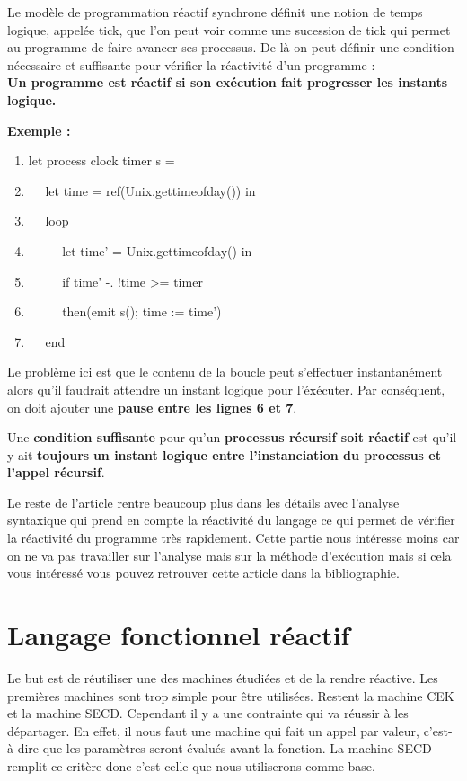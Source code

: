 \documentclass[10pt,a4paper]{report}
\begin{document}
Le modèle de programmation réactif synchrone définit une notion de temps logique, appelée tick, que l'on peut voir comme une sucession de tick qui permet au programme de faire avancer ses processus. De là on peut définir une condition nécessaire et suffisante pour vérifier la réactivité d'un programme : 	
\\\textbf{Un programme est r\'{e}actif si son ex\'{e}cution fait progresser les instants logique.}
\medbreak

\textbf{Exemple :}
\smallbreak
\begin{enumerate}
\item let process clock timer s =
\item $\quad$ let time = ref(Unix.gettimeofday()) in
\item $\quad$ loop
\item $\quad$ $\quad$ let time' = Unix.gettimeofday() in
\item $\quad$ $\quad$ if time' -. !time >= timer
\item $\quad$ $\quad$ then(emit s(); time := time')
\item $\quad$ end 
\end{enumerate}
\medbreak

Le probl\`{e}me ici est que le contenu de la boucle peut s'effectuer instantan\'{e}ment alors qu'il faudrait attendre un instant logique pour l'éxécuter. Par conséquent, on doit ajouter une \textbf{pause entre les lignes 6 et 7}.
\bigbreak

Une \textbf{condition suffisante} pour qu'un \textbf{processus r\'{e}cursif soit r\'{e}actif} est qu'il y ait \textbf{toujours} \textbf{un instant logique entre l'instanciation du processus et l'appel r\'{e}cursif}.
\bigbreak


Le reste de l'article rentre beaucoup plus dans les détails avec l'analyse syntaxique qui prend en compte la réactivité du langage ce qui permet de vérifier la réactivité du programme très rapidement. Cette partie nous intéresse moins car on ne va pas travailler sur l'analyse mais sur la méthode d'exécution mais si cela vous intéressé vous pouvez retrouver cette article dans la bibliographie.



\chapter{Langage fonctionnel réactif}\label{SECDConc4}

Le but est de réutiliser une des machines étudiées et de la rendre réactive. Les premières machines sont trop simple pour être utilisées. Restent la machine CEK et la machine SECD. Cependant il y a une contrainte qui va réussir à les départager. En effet, il nous faut une machine qui fait un appel par valeur, c'est-à-dire que les paramètres seront évalués avant la fonction. La machine SECD remplit ce critère donc c'est celle que nous utiliserons comme base.
\medbreak
\end{document}
